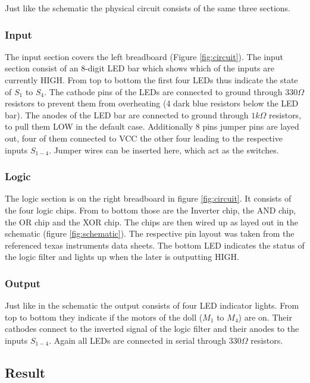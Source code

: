 \documentclass[14pt]{article}
\begin{document}
Just like the schematic the physical circuit consists of the same three sections. 



\subsubsection{Input}

The input section covers the left breadboard (Figure \ref{fig:circuit}).
The input section consist of an 8-digit LED bar which shows which of the inputs are currently HIGH. From top to bottom the first four LEDs thus indicate 
the state of $S_{1}$ to $S_{4}$. The cathode pins of the LEDs are connected to ground through $330\Omega$ resistors to prevent them from overheating 
(4 dark blue resistors below the LED bar). The anodes of the LED bar are connected to ground through $1k\Omega$ resistors, to pull them LOW in the
default case. Additionally 8 pins jumper pins are layed out, four of them connected to VCC the other four leading to the respective inputs
$S_{1-4}$. Jumper wires can be inserted here, which act as the switches.

\subsubsection{Logic}

The logic section is on the right breadboard in figure \ref{fig:circuit}. It consists of the four logic chips. From to bottom those are the
Inverter chip, the AND chip, the OR chip and the XOR chip. The chips are then wired up as layed out in the schematic (figure \ref{fig:schematic}).
The respective pin layout was taken from the referenced texas instruments data sheets. The bottom LED indicates the status of the logic filter and
lights up when the later is outputting HIGH.

\subsubsection{Output}

Just like in the schematic the output consists of four LED indicator lights. From top to bottom they indicate if the motors of the doll ($M_1$ to $M_4$)
are on. Their cathodes connect to the inverted signal of the logic filter and their anodes to the inputs $S_{1-4}$. Again all LEDs are connected
in serial through $330\Omega$ resistors.

\subsection{Result}
\end{document}
